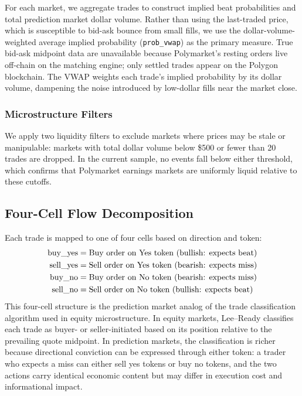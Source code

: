 \documentclass[11pt]{article}
\begin{document}
For each market, we aggregate trades to construct implied beat probabilities and total prediction market dollar volume. Rather than using the last-traded price, which is susceptible to bid-ask bounce from small fills, we use the dollar-volume-weighted average implied probability (\texttt{prob\_vwap}) as the primary measure. True bid-ask midpoint data are unavailable because Polymarket's resting orders live off-chain on the matching engine; only settled trades appear on the Polygon blockchain. The VWAP weights each trade's implied probability by its dollar volume, dampening the noise introduced by low-dollar fills near the market close.

\subsubsection{Microstructure Filters}

We apply two liquidity filters to exclude markets where prices may be stale or manipulable: markets with total dollar volume below \$500 or fewer than 20 trades are dropped. In the current sample, no events fall below either threshold, which confirms that Polymarket earnings markets are uniformly liquid relative to these cutoffs.

\subsection{Four-Cell Flow Decomposition}

Each trade is mapped to one of four cells based on direction and token:
\begin{align}
\text{buy\_yes} &= \text{Buy order on Yes token (bullish: expects beat)} \notag \\
\text{sell\_yes} &= \text{Sell order on Yes token (bearish: expects miss)} \notag \\
\text{buy\_no} &= \text{Buy order on No token (bearish: expects miss)} \notag \\
\text{sell\_no} &= \text{Sell order on No token (bullish: expects beat)} \notag
\end{align}
This four-cell structure is the prediction market analog of the \citet{lee1991inferring} trade classification algorithm used in equity microstructure. In equity markets, Lee--Ready classifies each trade as buyer- or seller-initiated based on its position relative to the prevailing quote midpoint. In prediction markets, the classification is richer because directional conviction can be expressed through either token: a trader who expects a miss can either sell yes tokens or buy no tokens, and the two actions carry identical economic content but may differ in execution cost and informational impact.
\end{document}
